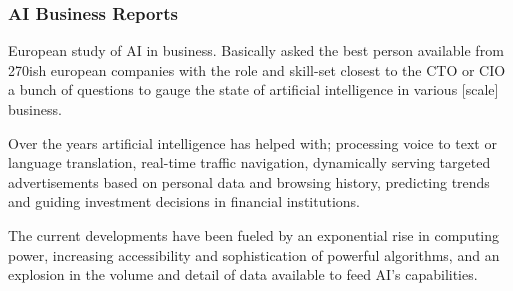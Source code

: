 \documentclass{article}
\newcounter{subsubsubsection}[subsubsection]
\begin{document}
\newpage 


\newpage 


\newpage 


\newpage 


\newpage 


\newpage 


\newpage 


\subsubsection{AI Business Reports}

\newpage 


\vspace{0.45cm}

European study of AI in business. Basically asked the best person available from 270ish european companies with the role and skill-set closest to the CTO or CIO a bunch of questions to gauge the state of artificial intelligence in various [scale] business. 

\vspace{0.2cm}

\hspace{-0.675cm} Over the years artificial intelligence has helped with; processing voice to text or language translation, real-time traffic navigation, dynamically serving targeted advertisements based on personal data and browsing history, predicting trends and guiding investment decisions in financial institutions. 

\vspace{0.2cm}

\hspace{-0.675cm} The current developments have been fueled by an exponential rise in computing power, increasing accessibility and sophistication of powerful algorithms, and an explosion in the volume and detail of data available to feed AI’s capabilities. 

\vspace{0.2cm}
\end{document}
